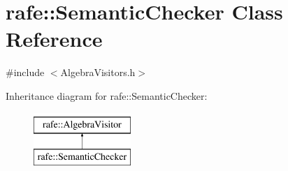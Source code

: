 \hypertarget{classrafe_1_1_semantic_checker}{\section{rafe\+:\+:Semantic\+Checker Class Reference}
\label{classrafe_1_1_semantic_checker}
}


{\ttfamily \#include $<$Algebra\+Visitors.\+h$>$}

Inheritance diagram for rafe\+:\+:Semantic\+Checker\+:\begin{figure}[H]
\begin{center}
\leavevmode
\includegraphics[height=2.000000cm]{classrafe_1_1_semantic_checker}
\end{center}
\end{figure}
